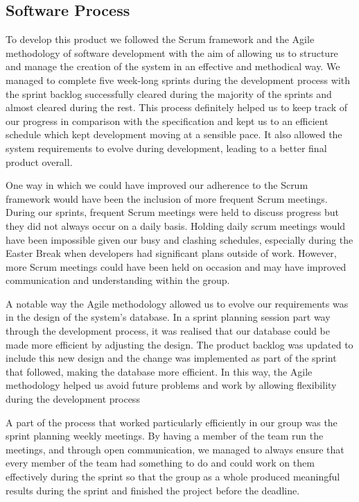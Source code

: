 \documentclass[12pt]{article}
\begin{document}
\subsection{Software Process}
To develop this product we followed the Scrum framework and the Agile 
methodology of software development with the aim of allowing us to structure 
and manage the creation of the system in an effective and methodical way. We 
managed to complete five week-long sprints during the development process with 
the sprint backlog successfully cleared during the majority of the sprints and 
almost cleared during the rest.  This process definitely helped us to keep 
track of our progress in comparison with the specification and kept us to an 
efficient schedule which kept development moving at a sensible pace. It also 
allowed the system requirements to evolve during development, leading to a 
better final product overall.\par

One way in which we could have improved our adherence to the Scrum framework 
would have been the inclusion of more frequent Scrum meetings. During our 
sprints, frequent Scrum meetings were held to discuss progress but they did 
not always occur on a daily basis. Holding daily scrum meetings would have 
been impossible given our busy and clashing schedules, especially during 
the Easter Break when developers had significant plans outside of work. 
However, more Scrum meetings could have been held on occasion and may have 
improved communication and understanding within the group.\par

A notable way the Agile methodology allowed us to evolve our requirements 
was in the design of the system's database. In a sprint planning session 
part way through the development process, it was realised that our database 
could be made more efficient by adjusting the design. The product 
backlog was updated to include this new design and the change was implemented 
as part of the sprint that followed, making the database more efficient. In 
this way, the Agile methodology helped us avoid future problems and work by 
allowing flexibility during the development process\par

A part of the process that worked particularly efficiently in our group was 
the sprint planning weekly meetings. By having a member of the team run the 
meetings, and through open communication, we managed to always ensure that 
every member of the team had something to do and could work on them 
effectively during the sprint so that the group as a whole produced 
meaningful results during the sprint and finished the project before 
the deadline.\par
\end{document}
